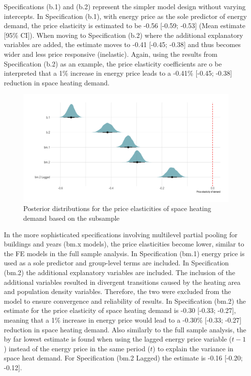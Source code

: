 \documentclass[12pt,twoside]{reedthesis}
\begin{document}
Specifications (b.1) and (b.2) represent the simpler model design without varying intercepts. In Specification (b.1), with energy price as the sole predictor of energy demand, the price elasticity is estimated to be -0.56 {[}-0.59; -0.53{]} (Mean estimate {[}95\% CI{]}). When moving to Specification (b.2) where the additional explanatory variables are added, the estimate moves to -0.41 {[}-0.45; -0.38{]} and thus becomes wider and less price responsive (inelastic). Again, using the results from Specification (b.2) as an example, the price elasticity coefficients are o be interpreted that a 1\% increase in energy price leads to a -0.41\% {[}-0.45; -0.38{]} reduction in space heating demand.
\begin{figure}

{\centering \includegraphics[width=1\linewidth]{figure/posterior-distributions} 

}

\caption{Posterior distributions for the price elasticities of space heating demand based on the subsample}\label{fig:posterior-distributions}
\end{figure}
In the more sophisticated specifications involving multilevel partial pooling for buildings and years (bm.x models), the price elasticities become lower, similar to the FE models in the full sample analysis. In Specification (bm.1) energy price is used as a sole predictor and group-level terms are included. In Specification (bm.2) the additional explanatory variables are included. The inclusion of the additional variables resulted in divergent transitions caused by the heating area and population density variables. Therefore, the two were excluded from the model to ensure convergence and reliability of results. In Specification (bm.2) the estimate for the price elasticity of space heating demand is -0.30 {[}-0.33; -0.27{]}, meaning that a 1\% increase in energy price would lead to a -0.30\% {[}-0.33; -0.27{]} reduction in space heating demand. Also similarly to the full sample analysis, the by far lowest estimate is found when using the lagged energy price variable (\(t-1\)) instead of the energy price in the same period (\(t\)) to explain the variance in space heat demand. For Specification (bm.2 Lagged) the estimate is -0.16 {[}-0.20; -0.12{]}.
\end{document}
